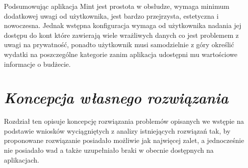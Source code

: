 \documentclass[a4paper, 10pt, twoside, openright]{report}
\newcommand{\customstylechapter}[1]{\large{\textit{#1}}}
\newcommand{\customstylesection}[1]{\textbf{\textit{#1}}}
\begin{document}
\begin{large}
{Podsumowując aplikacja Mint jest prostota w obsłudze, wymaga minimum dodatkowej
 uwagi od użytkownika, jest bardzo przejrzysta, estetyczna i nowoczesna. Jednak 
wstępna konfiguracja wymaga od użytkownika nadania jej dostępu do kont które 
zawierają wiele wrażliwych danych co jest problemem z uwagi na prywatność, 
ponadto użytkownik musi samodzielnie z góry określić wydatki na poszczególne 
kategorie zanim aplikacja udostępni mu wartościowe informacje o budżecie.}


\chapter{\customstylechapter{Koncepcja własnego rozwiązania}}
{Rozdział ten opisuje koncepcję rozwiązania problemów opisanych we wstępie na 
podstawie wniosków wyciągniętych z analizy istniejących rozwiązań tak, by 
proponowane rozwiązanie posiadało możliwie jak najwięcej zalet, a jednocześnie 
nie posiadało wad a także uzupełniało braki w obecnie dostępnych na aplikacjach.}


\end{large}
\end{document}
